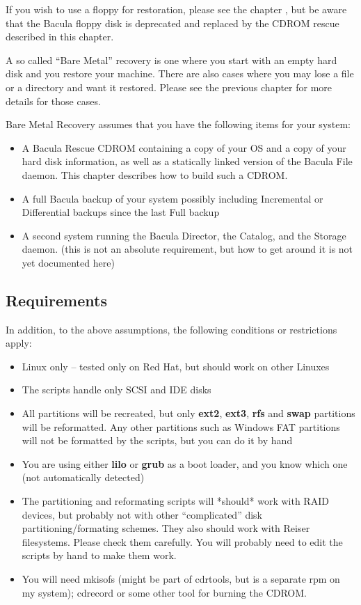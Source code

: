 If you wish to use a floppy for restoration, please see the chapter 
, but be aware that the Bacula floppy disk is deprecated
and replaced by the CDROM rescue described in this chapter. 

A so called ``Bare Metal'' recovery is one where you start with an empty hard
disk and you restore your machine. There are also cases where you may lose a
file or a directory and want it restored. Please see the previous chapter for
more details for those cases. 

Bare Metal Recovery assumes that you have the following items for your system:

\begin{itemize}
\item A Bacula Rescue CDROM containing a copy of your OS and  a copy of your
   hard disk information, as well as a  statically linked version of the Bacula
   File daemon. This chapter describes how to build such a CDROM.
\item A full Bacula backup of your system possibly including  Incremental or
   Differential backups since the last Full  backup 
\item A second system running the Bacula Director, the Catalog,  and the
   Storage daemon. (this is not an absolute requirement,  but how to get around
   it is not yet documented here) 
\end{itemize}

\subsection*{Requirements}

In addition, to the above assumptions, the following conditions or
restrictions apply: 

\begin{itemize}
\item Linux only -- tested only on Red Hat, but should work on other Linuxes  
\item The scripts handle only SCSI and IDE disks  
\item All partitions will be recreated, but only {\bf ext2},  {\bf ext3}, {\bf
   rfs} and {\bf swap} partitions will be reformatted.  Any other partitions such
   as Windows FAT partitions will  not be formatted by the scripts, but you can
   do it by hand  
\item You are using either {\bf lilo} or {\bf grub} as a boot  loader, and you
   know which one (not automatically detected)  
\item The partitioning and reformating scripts will *should* work with RAID 
   devices, but probably not with other ``complicated'' disk 
   partitioning/formating schemes. They also should work with  Reiser
   filesystems. Please check them carefully. You  will probably need to edit the
   scripts by hand to make them work.  
\item You will need mkisofs (might be part of cdrtools, but is a separate rpm 
   on my system); cdrecord or some other tool for burning the CDROM. 
   \end{itemize}

